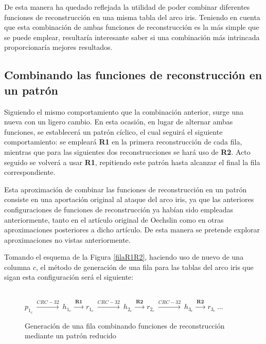 \documentclass[12pt,spanish,listoffigures,listoftables,listofalgorithms]{tfgetsinf}
\begin{document}
De esta manera ha quedado reflejada la utilidad de poder combinar diferentes funciones de reconstrucción en una misma tabla del arco iris. Teniendo en cuenta que esta combinación de ambas funciones de reconstrucción es la más simple que se puede emplear, resultaría interesante saber si una combinación más intrincada proporcionaría mejores resultados.

\subsection{Combinando las funciones de reconstrucción en un patrón}

Siguiendo el mismo comportamiento que la combinación anterior, surge una nueva con un ligero cambio. En esta ocasión, en lugar de alternar ambas funciones, se establecerá un patrón cíclico, el cual seguirá el siguiente comportamiento: se empleará \textbf{R1} en la primera reconstrucción de cada fila, mientras que para las siguientes dos reconstrucciones se hará uso de \textbf{R2}. Acto seguido se volverá a usar \textbf{R1}, repitiendo este patrón hasta alcanzar el final la fila correspondiente.

Esta aproximación de combinar las funciones de reconstrucción en un patrón consiste en una aportación original al ataque del arco iris, ya que las anteriores configuraciones de funciones de reconstrucción ya habían sido empleadas anteriormente, tanto en el artículo original de Oechslin \cite{rainbow} como en otras aproximaciones posteriores a dicho artículo. De esta manera se pretende explorar aproximaciones no vistas anteriormente.

Tomando el esquema de la Figura \ref{filaR1R2}, haciendo uso de nuevo de una columna $c$, el método de generación de una fila para las tablas del arco iris que sigan esta configuración será el siguiente:

\begin{figure}[H]
	
	\centering

	~\\

	$p_{1_c}~ \xrightarrow{CRC-32}~ h_{1_c}~ \xrightarrow{\textbf{R1}}~ r_{1_c}~ \xrightarrow{CRC-32}~ h_{2_c}~ \xrightarrow{\textbf{R2}}~ r_{2_c}~ \xrightarrow{CRC-32}~ h_{3_c}~ \xrightarrow{\textbf{R2}}~ r_{3_c}~ \dots$

	\caption{Generación de una fila combinando funciones de reconstrucción mediante un patrón reducido}
	\label{filapp}

\end{figure}
\end{document}

